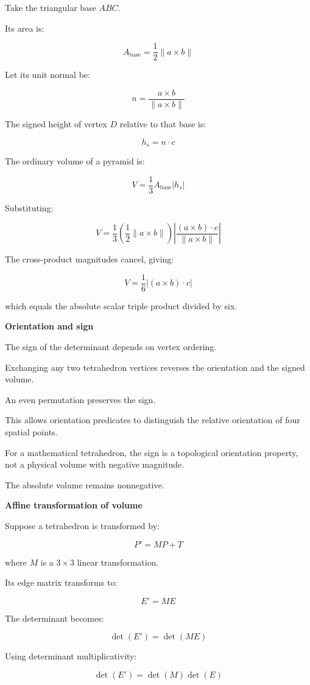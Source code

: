 Take the triangular base \(ABC\).

Its area is:

\[
A_{\mathrm{base}}= \frac12\|a\times b\|
\]

Let its unit normal be:

\[
n=\frac{a\times b}{\|a\times b\|}
\]

The signed height of vertex \(D\) relative to that base is:

\[
h_s=n\cdot c
\]

The ordinary volume of a pyramid is:

\[
V=\frac13A_{\mathrm{base}}|h_s|
\]

Substituting:

\[
V=\frac13\left(\frac12\|a\times b\|\right) \left|\frac{(a\times b)\cdot c}{\|a\times b\|}\right|
\]

The cross-product magnitudes cancel, giving:

\[
V=\frac16|(a\times b)\cdot c|
\]

which equals the absolute scalar triple product divided by six.

\textbf{Orientation and sign}

The sign of the determinant depends on vertex ordering.

Exchanging any two tetrahedron vertices reverses the orientation and the signed volume.

An even permutation preserves the sign.

This allows orientation predicates to distinguish the relative orientation of four spatial points.

For a mathematical tetrahedron, the sign is a topological orientation property, not a physical volume with negative magnitude.

The absolute volume remains nonnegative.

\textbf{Affine transformation of volume}

Suppose a tetrahedron is transformed by:

\[
P'=MP+T
\]

where \(M\) is a \(3\times3\) linear transformation.

Its edge matrix transforms to:

\[
E'=ME
\]

The determinant becomes:

\[
\det(E')=\det(ME)
\]

Using determinant multiplicativity:

\[
\det(E')=\det(M)\det(E)
\]

